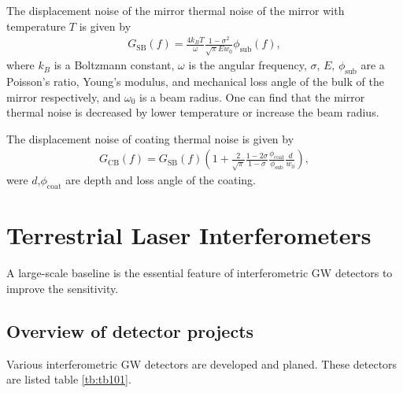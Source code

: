 The displacement noise of the mirror thermal noise of the mirror with temperature $T$ is given by \cite{levin1998internal,numata2003wide}
\begin{eqnarray}
  G_{\mathrm{SB}}(f)=\frac{4 k_{B} T}{\omega} \frac{1-\sigma^{2}}{\sqrt{\pi} E w_{0}} \phi_{\mathrm{sub}}(f),
  \label{eq:eq140}
\end{eqnarray}
where $k_{B}$ is a Boltzmann constant, $\omega$ is the angular frequency, $\sigma,\,E,\, \phi_{\mathrm{sub}}$ are a Poisson's ratio, Young's modulus, and mechanical loss angle of the bulk of the mirror respectively, and $\omega_0$ is a beam radius. One can find that the mirror thermal noise is decreased by lower temperature or increase the beam radius.

The displacement noise of coating thermal noise is given by \cite{numata2003wide,harry2002thermal}
\begin{eqnarray}
  G_{\mathrm{CB}}(f)=G_{\mathrm{SB}}(f)\left(1+\frac{2}{\sqrt{\pi}} \frac{1-2 \sigma}{1-\sigma} \frac{\phi_{\mathrm{coat}}}{\phi_{\mathrm{sub}}} \frac{d}{w_{0}}\right), 
\end{eqnarray}
were $d$,$\phi_{\mathrm{coat}}$ are depth and loss angle of the coating.


\section{Terrestrial Laser Interferometers} \label{sec:14}
A large-scale baseline is the essential feature of interferometric GW detectors to improve the sensitivity. 

\subsection{ Overview of detector projects}
Various interferometric GW detectors are developed and planed. These detectors are listed table \ref{tb:tb101}. 


